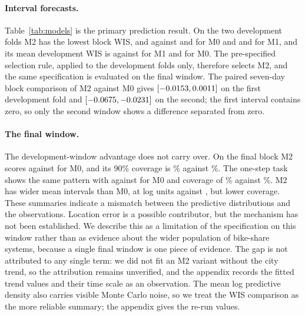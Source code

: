 \documentclass{article}
\begin{document}
\paragraph{Interval forecasts.}
Table~\ref{tab:models} is the primary prediction result. On the two development folds M2 has the
lowest block WIS, \MTwoDevOneWis{} and \MTwoDevTwoWis{} against \MZeroDevOneWis{} and
\MZeroDevTwoWis{} for M0 and \MOneDevOneWis{} and \MOneDevTwoWis{} for M1, and its mean development
WIS is \SelDevMeanWis{} against \MOneDevMeanWis{} for M1 and \MZeroDevMeanWis{} for M0. The
pre-specified selection rule, applied to the development folds only, therefore selects M2, and the
same specification is evaluated on the final window. The paired seven-day block comparison of M2
against M0 gives $[-0.0153,0.0011]$ on the first development fold and
$[-0.0675,-0.0231]$ on the second; the first interval contains zero, so only the second
window shows a difference separated from zero.

\begin{table}[t]
\centering
\footnotesize
\caption{Interval forecasts for the fitted models. WIS is city-equal on the $\log(1+\text{usage})$
scale and lower is better; coverage is the city-equal 90\% interval coverage. Block and one-step
condition on different information and are not comparable.}
\label{tab:models}

\end{table}

\paragraph{The final window.}
The development-window advantage does not carry over. On the final block M2 scores \MTwoFinalWis{}
against \MZeroFinalWis{} for M0, and its 90\% coverage is \MTwoFinalBlockCov\% against
\MZeroFinalBlockCov\%. The one-step task shows the same pattern with \MTwoFinalStepWis{} against
\MZeroFinalStepWis{} for M0 and coverage of \MTwoFinalStepCov\% against \MZeroFinalStepCov\%. M2 has
wider mean intervals than M0, at \MTwoFinalBlockWidth{} log units against \MZeroFinalBlockWidth, but
lower coverage. These summaries indicate a mismatch between the predictive distributions and the
observations. Location error is a possible contributor, but the mechanism has not been established.
We describe this as a limitation of the specification on this window rather than as evidence about
the wider population of bike-share systems, because a single final window is one piece of evidence.
The gap is not attributed to any single term: we did not fit an M2 variant without the city trend, so
the attribution remains unverified, and the appendix records the fitted trend values and their time
scale as an observation. The mean log predictive density also carries visible Monte Carlo noise, so
we treat the WIS comparison as the more reliable summary; the appendix gives the re-run values.
\end{document}
